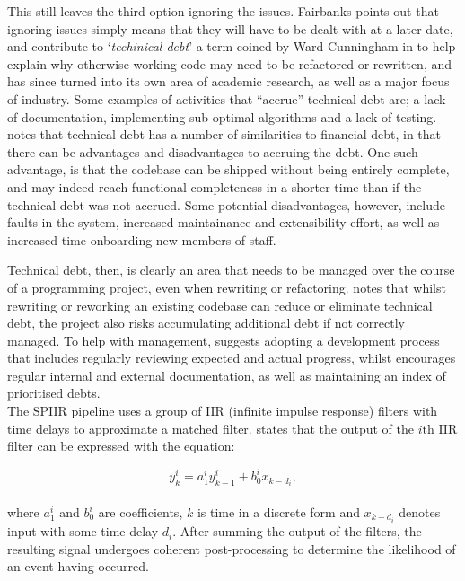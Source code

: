 \documentclass{article}
\begin{document}
This still leaves the third option \textendash{} ignoring the issues. Fairbanks points out that
ignoring issues simply means that they will have to be dealt with at a later date, and contribute to
`\textit{techinical debt}' \textendash{} a term coined by Ward Cunningham in \cite{Cunningham} to
help explain why otherwise working code may need to be refactored or rewritten, and has since turned
into its own area of academic research, as well as a major focus of industry. Some examples of
activities that ``accrue'' technical debt are; a lack of documentation, implementing sub-optimal
algorithms and a lack of testing. \cite{Allman} notes that technical debt has a number of
similarities to financial debt, in that there can be advantages and disadvantages to accruing the
debt. One such advantage, is that the codebase can be shipped without being entirely complete, and
may indeed reach functional completeness in a shorter time than if the technical debt was not
accrued. Some potential disadvantages, however, include faults in the system, increased maintainance
and extensibility effort, as well as increased time onboarding new members of staff.

Technical debt, then, is clearly an area that needs to be managed over the course of a programming
project, even when rewriting or refactoring. \cite{Fairley} notes that whilst rewriting or reworking
an existing codebase can reduce or eliminate technical debt, the project also risks accumulating
additional debt if not correctly managed. To help with management, \cite{Fairley} suggests adopting
a development process that includes regularly reviewing expected and actual progress, whilst
\cite{Allman} encourages regular internal and external documentation, as well as maintaining an
index of prioritised debts.
\\

The SPIIR pipeline uses a group of IIR (infinite impulse response) filters with time delays to
approximate a matched filter. \cite{SPIIRGPU2018} states that the output of the \(i\)th IIR filter
can be expressed with the equation:

\begin{equation}
    y^i_k = a^i_1y^i_{k-1} + b^i_0x_{k-d_i},
\end{equation}
\\
where \(a^i_1\) and \(b^i_0\) are coefficients, \(k\) is time in a discrete form and \(x_{k-d_i}\)
denotes input with some time delay \(d_i\). After summing the output of the filters, the resulting
signal undergoes coherent post-processing to determine the likelihood of an event having occurred.
\end{document}
